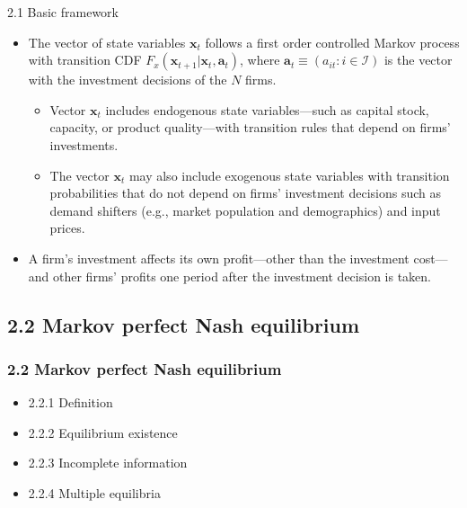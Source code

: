 \documentclass[aspectratio=169]{beamer}  %
\begin{document}
\begin{frame}
{2.1 Basic framework}
\begin{itemize}
    \item The vector of state variables \(\mathbf{x}_t\) follows a first order controlled Markov process with transition CDF \(F_x(\mathbf{x}_{t+1}|\mathbf{x}_t, \boldsymbol{a}_t)\), where \(\boldsymbol{a}_t \equiv (a_{it} : i \in \mathcal{I})\) is the vector with the investment decisions of the \(N\) firms. 
    \begin{itemize}
        \item Vector \(\mathbf{x}_t\) includes endogenous state variables—such as capital stock, capacity, or product quality—with transition rules that depend on firms' investments. 
        \item The vector \(\mathbf{x}_t\) may also include exogenous state variables with transition probabilities that do not depend on firms' investment decisions such as demand shifters (e.g., market population and demographics) and input prices.
    \end{itemize}
    \item A firm’s investment affects its own profit—other than the investment cost—and other firms’ profits one period after the investment decision is taken.
\end{itemize}
\end{frame}



\subsection{2.2 Markov perfect Nash equilibrium}
\begin{frame}
\frametitle{2.2 Markov perfect Nash equilibrium}
    \begin{itemize}
        \item 2.2.1 Definition
        \item 2.2.2 Equilibrium existence
        \item 2.2.3 Incomplete information
        \item 2.2.4 Multiple equilibria
    \end{itemize}
\end{frame}
\end{document}
